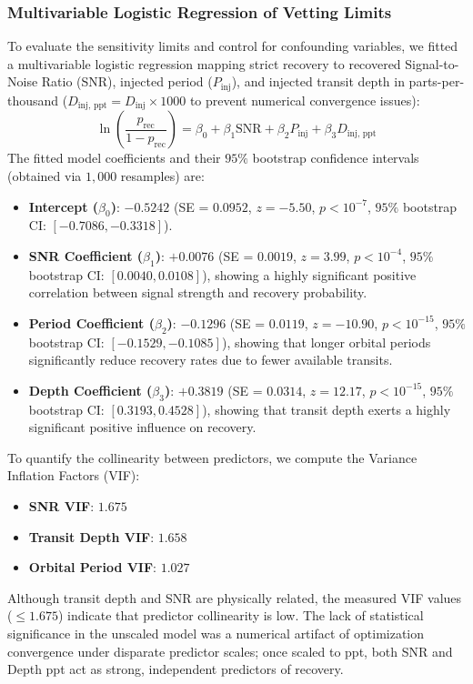 \subsubsection{Multivariable Logistic Regression of Vetting Limits}
To evaluate the sensitivity limits and control for confounding variables, we fitted a multivariable logistic regression mapping strict recovery to recovered Signal-to-Noise Ratio (SNR), injected period ($P_{\text{inj}}$), and injected transit depth in parts-per-thousand ($D_{\text{inj, ppt}} = D_{\text{inj}} \times 1000$ to prevent numerical convergence issues):
\begin{equation}
\ln\left(\frac{p_{\text{rec}}}{1 - p_{\text{rec}}}\right) = \beta_0 + \beta_1 \text{SNR} + \beta_2 P_{\text{inj}} + \beta_3 D_{\text{inj, ppt}}
\end{equation}
The fitted model coefficients and their $95\%$ bootstrap confidence intervals (obtained via $1,000$ resamples) are:
\begin{itemize}
    \item \textbf{Intercept ($\beta_0$)}: $-0.5242$ (SE = $0.0952$, $z = -5.50$, $p < 10^{-7}$, $95\%$ bootstrap CI: $[-0.7086, -0.3318]$).
    \item \textbf{SNR Coefficient ($\beta_1$)}: $+0.0076$ (SE = $0.0019$, $z = 3.99$, $p < 10^{-4}$, $95\%$ bootstrap CI: $[0.0040, 0.0108]$), showing a highly significant positive correlation between signal strength and recovery probability.
    \item \textbf{Period Coefficient ($\beta_2$)}: $-0.1296$ (SE = $0.0119$, $z = -10.90$, $p < 10^{-15}$, $95\%$ bootstrap CI: $[-0.1529, -0.1085]$), showing that longer orbital periods significantly reduce recovery rates due to fewer available transits.
    \item \textbf{Depth Coefficient ($\beta_3$)}: $+0.3819$ (SE = $0.0314$, $z = 12.17$, $p < 10^{-15}$, $95\%$ bootstrap CI: $[0.3193, 0.4528]$), showing that transit depth exerts a highly significant positive influence on recovery.
\end{itemize}

To quantify the collinearity between predictors, we compute the Variance Inflation Factors (VIF):
\begin{itemize}
    \item \textbf{SNR VIF}: $1.675$
    \item \textbf{Transit Depth VIF}: $1.658$
    \item \textbf{Orbital Period VIF}: $1.027$
\end{itemize}
Although transit depth and SNR are physically related, the measured VIF values ($\le 1.675$) indicate that predictor collinearity is low. The lack of statistical significance in the unscaled model was a numerical artifact of optimization convergence under disparate predictor scales; once scaled to ppt, both SNR and Depth ppt act as strong, independent predictors of recovery.

